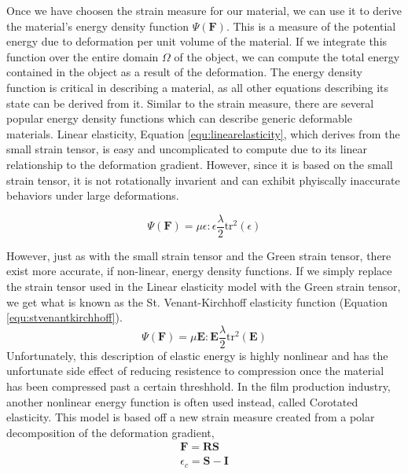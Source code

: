 \documentclass[12pt,oneside,letterpaper]{memoir}
\begin{document}
Once we have choosen the strain measure for our material, we can use
it to derive the material's energy density function
$\Psi(\mathbf{F})$. This is a measure of the potential energy due to
deformation per unit volume of the material. If we integrate this
function over the entire domain $\Omega$ of the object, we can compute
the total energy contained in the object as a result of the
deformation. The energy density function is critical in describing a
material, as all other equations describing its state can be derived
from it. Similar to the strain measure, there are several popular
energy density functions which can describe generic deformable
materials. Linear elasticity, Equation \ref{equ:linearelasticity},
which derives from the small strain tensor, is easy and uncomplicated
to compute due to its linear relationship to the deformation
gradient. However, since it is based on the small strain tensor, it is
not rotationally invarient and can exhibit phyiscally inaccurate
behaviors under large deformations.

\begin{equation}
  \label{equ:linearelasticity}
  \Psi(\mathbf{F}) = \mu \epsilon : \epsilon \frac \lambda 2 \text{tr}^2(\epsilon)
\end{equation}

However, just as with the small strain tensor and the Green strain
tensor, there exist more accurate, if non-linear, energy density
functions. If we simply replace the strain tensor used in the Linear
elasticity model with the Green strain tensor, we get what is known as
the St. Venant-Kirchhoff elasticity function (Equation
\ref{equ:stvenantkirchhoff}).
\begin{equation}
  \label{equ:stvenantkirchhoff}
  \Psi(\mathbf{F}) = \mu \mathbf{E} : \mathbf{E} \frac \lambda 2
  \text{tr}^2(\mathbf E)
\end{equation}
Unfortunately, this description of elastic energy is highly nonlinear
and has the unfortunate side effect of reducing resistence to
compression once the material has been compressed past a certain
threshhold. In the film production industry, another nonlinear energy
function is often used instead, called Corotated elasticity. This
model is based off a new strain measure created from a polar
decomposition of the deformation gradient,
\begin{gather*}
\mathbf F = \mathbf R\mathbf S\\
\epsilon_c = \mathbf S - \mathbf I
\end{gather*}
\end{document}
